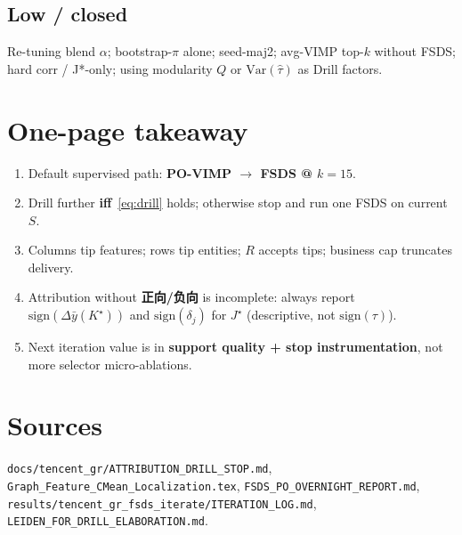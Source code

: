 \documentclass[11pt]{article}
\begin{document}
\subsection{Low / closed}
Re-tuning blend $\alpha$; bootstrap-$\pi$ alone; seed-maj2;
avg-VIMP top-$k$ without FSDS; hard corr / J*-only; using modularity
$Q$ or $\mathrm{Var}(\hat\tau)$ as Drill factors.

\section{One-page takeaway}
\label{sec:takeaway}
\begin{enumerate}[leftmargin=*,itemsep=0.35em]
  \item Default supervised path: \textbf{PO-VIMP $\to$ FSDS @ $k{=}15$}.
  \item Drill further \textbf{iff}~\eqref{eq:drill} holds; otherwise
        stop and run one FSDS on current $S$.
  \item Columns tip features; rows tip entities; $R$ accepts tips;
        business cap truncates delivery.
  \item Attribution without \textbf{正向/负向} is incomplete:
        always report $\mathrm{sign}(\Delta\bar y(K^\star))$ and
        $\mathrm{sign}(\delta_j)$ for $J^\star$ (descriptive, not
        $\mathrm{sign}(\tau)$).
  \item Next iteration value is in \textbf{support quality + stop
        instrumentation}, not more selector micro-ablations.
\end{enumerate}

\section{Sources}
\texttt{docs/tencent\_gr/ATTRIBUTION\_DRILL\_STOP.md},
\texttt{Graph\_Feature\_CMean\_Localization.tex},
\texttt{FSDS\_PO\_OVERNIGHT\_REPORT.md},
\texttt{results/tencent\_gr\_fsds\_iterate/ITERATION\_LOG.md},
\texttt{LEIDEN\_FOR\_DRILL\_ELABORATION.md}.
\end{document}
